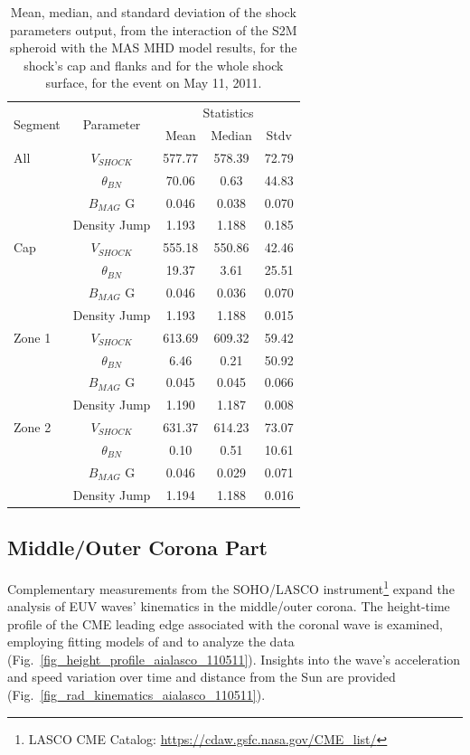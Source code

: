 \begin{table}[!htp] %
	\centering
	\caption{Mean, median, and standard deviation of the shock parameters output, from the interaction of the S2M spheroid with the MAS MHD model results, for the shock's cap and flanks and for the whole shock surface, for the event on May 11, 2011.}
	\label{T_sh_param_110511}
	\begin{tabular}{lcccc}
		\hline
		\multirow{2}{*}{Segment} & \multirow{2}{*}{Parameter} & \multicolumn{3}{c}{Statistics} \\
		&                         & Mean & Median & Stdv \\ \hline
		All & $V_{SHOCK}$ \kms    & 577.77 & 578.39 & 72.79 \\ 
		& $\theta_{BN}$ \degree   & 70.06 & 0.63 & 44.83 \\ 
		& $B_{MAG}$ G             & 0.046 & 0.038 & 0.070 \\ 
		& Density Jump            & 1.193 & 1.188 & 0.185 \\ \hline
		
		Cap & $V_{SHOCK}$ \kms    & 555.18 & 550.86 & 42.46 \\ 
		& $\theta_{BN}$ \degree   & 19.37 & 3.61 & 25.51 \\ 
		& $B_{MAG}$ G             & 0.046 & 0.036 & 0.070 \\ 
		& Density Jump            & 1.193 & 1.188 & 0.015 \\ \hline
		
		Zone 1 & $V_{SHOCK}$ \kms & 613.69 & 609.32 & 59.42 \\ 
		& $\theta_{BN}$ \degree   & 6.46 & 0.21 & 50.92 \\ 
		& $B_{MAG}$ G             & 0.045 & 0.045 & 0.066 \\ 
		& Density Jump            & 1.190 & 1.187 & 0.008 \\ \hline
		
		Zone 2 & $V_{SHOCK}$ \kms & 631.37 & 614.23 & 73.07 \\ 
		& $\theta_{BN}$ \degree   & 0.10 & 0.51 & 10.61 \\ 
		& $B_{MAG}$ G             & 0.046 & 0.029 & 0.071 \\ 
		& Density Jump            & 1.194 & 1.188 & 0.016 \\ \hline
	\end{tabular}
\end{table}

\subsection{Middle/Outer Corona Part}
Complementary measurements from the SOHO/LASCO instrument\footnote{LASCO CME Catalog: \url{https://cdaw.gsfc.nasa.gov/CME_list/}} expand the analysis of EUV waves' kinematics in the middle/outer corona. The height-time profile of the CME leading edge associated with the coronal wave is examined, employing fitting models of \citet{gallagher_2003} and \citet{byrne_2013} to analyze the data (Fig.~\ref{fig_height_profile_aialasco_110511}). Insights into the wave's acceleration and speed variation over time and distance from the Sun are provided (Fig.~\ref{fig_rad_kinematics_aialasco_110511}).

